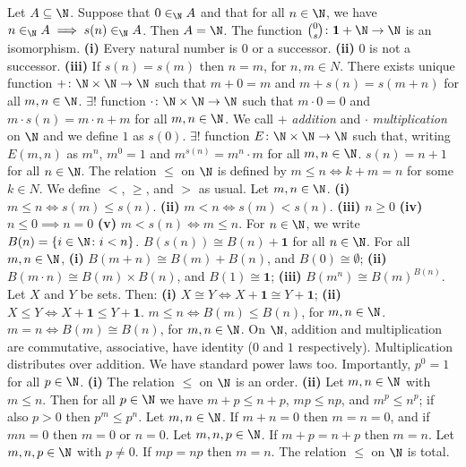  Let $A \subseteq \N$. Suppose that $0 \in_{\N} A$ and that for all $n \in \N$, we have $n \in_{\N} A \implies s(n) \in_{\N} A$. Then $A = \N$.
 The function $\binom{0}{s} \colon \mathbf{1} + \N \to \N$ is an isomorphism.
 \textbf{(i)} Every natural number is $0$ or a successor. \textbf{(ii)} $0$ is not a successor. \textbf{(iii)} If $s(n) = s(m)$ then $n = m$, for $n, m \in N$.
 There exists unique function $+ \colon \N \times \N \to \N$ such that $m + 0 = m$ and $m + s(n) = s (m + n)$ for all $m, n \in \N$.
 $\exists!$ function $\cdot \colon \N \times \N \to \N$ such that $m \cdot 0 = 0$ and $m \cdot s(n) = m \cdot n + m$ for all $m, n \in \N$.
 We call $+$ \textit{addition} and $\cdot$ \textit{multiplication} on $\N$ and we define $1$ as $s(0)$.
 $\exists!$ function $E \colon \N \times \N \to \N$ such that, writing $E(m, n)$ as $m^n$, $m^0 = 1$ and $m^{s(n)} = m^n \cdot m$ for all $m, n \in \N$.
 $s(n) = n + 1$ for all $n \in \N$.
 The relation $\leq$ on $\N$ is defined by $m \leq n \iff k + m = n$ for some $k \in N$. We define $<$, $\geq$, and $>$ as usual.
 Let $m, n \in \N$. \textbf{(i)} $m \leq n \iff s(m) \leq s(n)$. \textbf{(ii)} $m < n \iff s(m) < s(n)$. \textbf{(iii)} $n \geq 0$ \textbf{(iv)} $n \leq 0 \implies n = 0$ \textbf{(v)} $m < s(n) \iff m \leq n$.
 For $n \in \N$, we write $B(n) = \{ i \in \N \colon i < n \}$.
 $B(s(n)) \cong B(n) + \mathbf{1}$ for all $n \in \N$.
 For all $m, n \in \N$, \textbf{(i)} $B(m + n) \cong B(m) + B(n)$, and $B(0) \cong \emptyset$; \textbf{(ii)} $B(m \cdot n) \cong B(m) \times B(n)$, and $B(1) \cong \mathbf{1}$; \textbf{(iii)} $B(m^n) \cong B(m)^{B(n)}$.
 Let $X$ and $Y$ be sets. Then: \textbf{(i)} $X \cong Y \iff X + \mathbf{1} \cong Y + \mathbf{1}$; \textbf{(ii)} $X \leq Y \iff X + \mathbf{1} \leq Y + \mathbf{1}$.
 $m \leq n \iff B(m) \leq B(n)$, for $m, n \in \N$.
 $m = n \iff B(m) \cong B(n)$, for $m, n \in \N$.
 On $\N$, addition and multiplication are commutative, associative, have identity ($0$ and $1$ respectively). Multiplication distributes over addition. We have standard power laws too. Importantly, $p^0 = 1$ for all $p \in \N$.
 \textbf{(i)} The relation $\leq$ on $\N$ is an order. \textbf{(ii)} Let $m, n \in \N$ with $m \leq n$. Then for all $p \in \N$ we have $m + p \leq n + p$, $mp \leq np$, and $m^p \leq n^p$; if also $p > 0$ then $p^m \leq p^n$.
 Let $m, n \in \N$. If $m + n = 0$ then $m = n = 0$, and if $mn = 0$ then $m = 0$ or $n = 0$.
 Let $m, n, p \in \N$. If $m + p = n + p$ then $m = n$.
 Let $m, n, p \in \N$ with $p \neq 0$. If $m p = n p$ then $m = n$.
 The relation $\leq$ on $\N$ is total.
